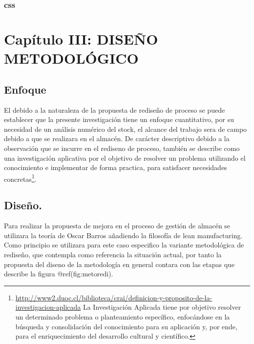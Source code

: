 \documentclass[
]{article}
\begin{document}
\hypertarget{css}{%
\subsubsection{css}\label{css}}

\newpage

\hypertarget{capuxedtulo-iii-diseuxf1o-metodoluxf3gico}{%
\section{Capítulo III: DISEÑO
METODOLÓGICO}\label{capuxedtulo-iii-diseuxf1o-metodoluxf3gico}}

\hypertarget{enfoque}{%
\subsection{Enfoque}\label{enfoque}}

El debido a la naturaleza de la propuesta de rediseño de proceso se
puede establecer que la presente investigación tiene un enfoque
cuantitativo, por su necesidad de un análisis numérico del stock, el
alcance del trabajo sera de campo debido a que se realizara en el
almacén. De carácter descriptivo debido a la observación que se incurre
en el rediseno de proceso, también se describe como una investigación
aplicativa por el objetivo de resolver un problema utilizando el
conocimiento e implementar de forma practica, para satisfacer
necesidades concretas\footnote{\url{http://www2.duoc.cl/biblioteca/crai/definicion-y-proposito-de-la-investigacion-aplicada}
  La Investigación Aplicada tiene por objetivo resolver un determinado
  problema o planteamiento específico, enfocándose en la búsqueda y
  consolidación del conocimiento para su aplicación y, por ende, para el
  enriquecimiento del desarrollo cultural y científico.}.

\hypertarget{diseuxf1o.}{%
\subsection{Diseño.}\label{diseuxf1o.}}

Para realizar la propuesta de mejora en el proceso de gestión de almacén
se utilizara la teoría de Oscar Barros añadiendo la filosofía de lean
manufacturing. Como principio se utilizara para este caso especifico la
variante metodológica de rediseño, que contempla como referencia la
situación actual, por tanto la propuesta del diseno de la metodología en
general contara con las etapas que describe la figura
@ref(fig:metoredi).
\end{document}

